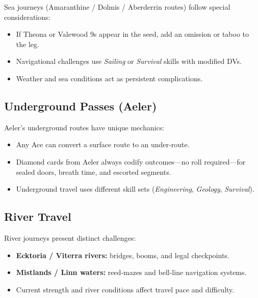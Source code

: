 Sea journeys (Amaranthine / Dolmis / Aberderrin routes) follow special considerations:

\begin{itemize}
    \item If Theona or Valewood 9s appear in the seed, add an omission or taboo to the leg.
    \item Navigational challenges use \emph{Sailing} or \emph{Survival} skills with modified DVs.
    \item Weather and sea conditions act as persistent complications.
\end{itemize}

\subsection{Underground Passes (Aeler)}\label{subsec:underways}

Aeler's underground routes have unique mechanics:

\begin{itemize}
    \item Any Ace can convert a surface route to an under‑route.
    \item Diamond cards from Aeler always codify outcomes---no roll required---for sealed doors, breath time, and escorted segments.
    \item Underground travel uses different skill sets (\emph{Engineering}, \emph{Geology}, \emph{Survival}).
\end{itemize}

\subsection{River Travel}\label{subsec:river_travel}

River journeys present distinct challenges:

\begin{itemize}
    \item \textbf{Ecktoria / Viterra rivers:} bridges, booms, and legal checkpoints.
    \item \textbf{Mistlands / Linn waters:} reed‑mazes and bell‑line navigation systems.
    \item Current strength and river conditions affect travel pace and difficulty.
\end{itemize}

